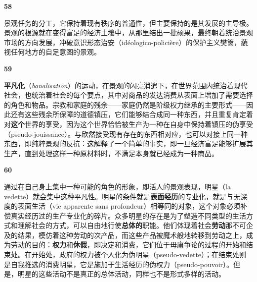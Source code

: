 \documentclass[fontset=fandol, a4paper, 12pt, openright]{ctexbook}
\makeatletter
\newcommand{\thesis}[1]{%
    \par\vspace{1.5em}%
    {\centering \textbf{\Large #1}\par}%
    \nobreak\vspace{0.5em}\nobreak
    \@afterindenttrue %
    \@afterheading    %
}
\makeatother
\begin{document}
\thesis{58}
景观任务的分工，它保持着现有秩序的普通性，但主要保持的是其发展的主导极。景观的根源就在变得富足的经济土壤中，从那里结出一批硕果，最终朝着统治景观市场的方向发展，冲破意识形态治安（idéologico-policière）的保护主义樊篱，藐视任何地方的自足意图的景观。

\thesis{59}
\textbf{平凡化}（\textit{banalisation}）的运动，在景观的闪亮消遣下，在世界范围内统治着现代社会，也统治着社会的每个要点，其中对商品的发达消费从表面上增加了需要选择的角色和物品。宗教和家庭的残余——家庭仍然是阶级权力继承的主要形式——因此还有这些残余所保障的道德镇压，它们能够结合成同一种东西，并且重复肯定着对\textbf{这个}世界的享受，因为这个世界恰恰被生产为一种在自身中保持着镇压的伪享受（pseudo-jouissance）。与欣然接受现有存在的东西相对应，也可以对接上同一种东西，即纯粹景观的反抗：这解释了一个简单的事实，即一旦经济富足能够扩展其生产，直到处理这样一种原材料时，不满足本身就已经成为一种商品。

\thesis{60}
通过在自己身上集中一种可能的角色的形象，即活人的景观表现，明星（la vedette）就会集中这种平凡性。明星的条件就是\textbf{表面经历}的专业化，就是与无深度的表面生活（vie apparente sans profondeur）相等同的对象，这个对象必须补偿真实经历过的生产专业化的碎片。众多明星的存在是为了塑造不同类型的生活方式和理解社会的方式，可以自由地行使\textbf{总体的}职能。他们体现着社会\textbf{劳动}那不可企及的结果，模仿着这种劳动的次产品，而这些产品被魔术般地转移到劳动之上，成为劳动的目的：\textbf{权力}和\textbf{休假}，即决定和消费，它们位于毋庸争论的过程的开始和结束处。在开始处，政府的权力被个人化为伪明星（pseudo-vedette）；在结束处则是自我推选的消费明星，它是施加于生活经历的伪权力（pseudo-pouvoir）。但是，明星的这些活动不是真正的总体活动，同样也不是形式多样的活动。
\end{document}
